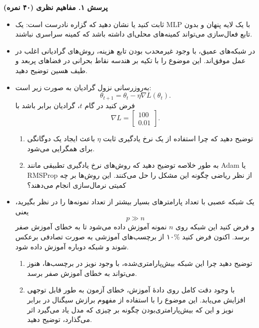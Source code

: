\textbf{پرسش ۱. مفاهیم نظری (۴۰ نمره)}

\begin{itemize}
    \item[\textbf{(الف)}] ثابت کنید یا نشان دهید که گزاره نادرست است: یک MLP با یک لایه پنهان و بدون تابع فعال‌سازی می‌تواند کمینه‌های محلی‌ای داشته باشد که کمینه سراسری نباشند.
    
    \item[\textbf{(ب)}] در شبکه‌های عمیق، با وجود غیرمحدب بودن تابع هزینه، روش‌های گرادیانی اغلب در عمل موفق‌اند. این موضوع را با تکیه بر هندسه نقاط بحرانی در فضاهای پربعد و طیف هسین توضیح دهید.
    
    \item[\textbf{(پ)}] به‌روزرسانی نزول گرادیان به صورت زیر است:
    \[
    \theta_{t+1} = \theta_t - \eta \nabla L(\theta_t).
    \]
    فرض کنید در گام $t$، گرادیان برابر باشد با
    \[
    \nabla L = \begin{bmatrix} 100 \\ 0.01 \end{bmatrix}.
    \]
    \begin{enumerate}
        \item[(۱)] توضیح دهید که چرا استفاده از یک نرخ یادگیری ثابت $\eta$ باعث ایجاد یک دوگانگی برای همگرایی می‌شود.
        \item[(۲)] به طور خلاصه توضیح دهید که روش‌های نرخ یادگیری تطبیقی مانند Adam یا RMSProp از نظر ریاضی چگونه این مشکل را حل می‌کنند. این روش‌ها بر چه کمیتی نرمال‌سازی انجام می‌دهند؟
    \end{enumerate}
    
    \item[\textbf{(ت)}] یک شبکه عصبی با تعداد پارامترهای بسیار بیشتر از تعداد نمونه‌ها را در نظر بگیرید، یعنی
    \[
    p \gg n
    \]
    و فرض کنید این شبکه روی $n$ نمونه آموزش داده می‌شود تا به خطای آموزش صفر برسد. اکنون فرض کنید \%۱۰ از برچسب‌های آموزشی به صورت تصادفی برعکس شوند و شبکه دوباره آموزش داده شود.
    \begin{enumerate}
        \item[(۱)] توضیح دهید چرا این شبکه بیش‌پارامتری‌شده، با وجود نویز در برچسب‌ها، هنوز می‌تواند به خطای آموزش صفر برسد.
        \item[(۲)] با وجود دقت کامل روی دادهٔ آموزش، خطای آزمون به طور قابل توجهی افزایش می‌یابد. این موضوع را با استفاده از مفهوم برازش سیگنال در برابر نویز و این که بیش‌پارامتری‌بودن چگونه بر چیزی که مدل یاد می‌گیرد اثر می‌گذارد، توضیح دهید.
    \end{enumerate}
\end{itemize}

